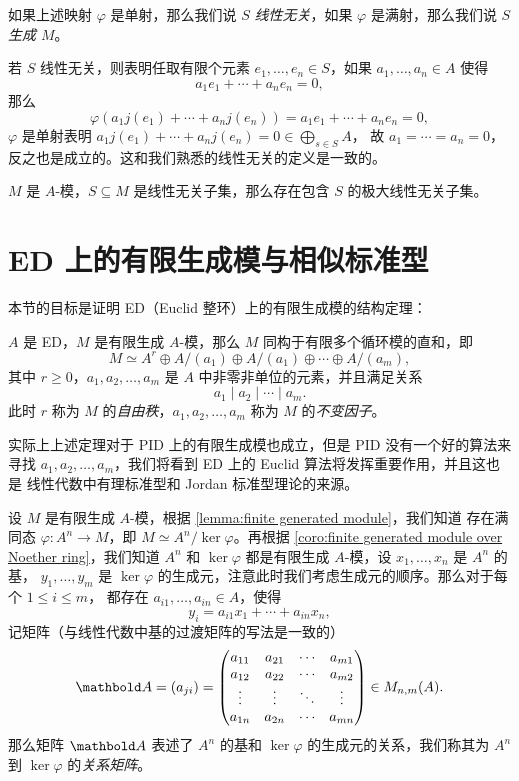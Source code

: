 \begin{definition}
  如果上述映射 $\varphi$ 是单射，那么我们说 $S$ \emph{线性无关}，如果
  $\varphi$ 是满射，那么我们说 $S$ \emph{生成 $M$}。  
\end{definition}

若 $S$ 线性无关，则表明任取有限个元素 $e_1,\dots,e_n\in S$，如果 $a_1,\dots,a_n\in A$
使得
\[
  a_1e_1+\cdots+a_ne_n=0,  
\]
那么
\[
  \varphi(a_1j(e_1)+\cdots+a_nj(e_n))
  =a_1e_1+\cdots+a_ne_n=0,
\]
$\varphi$ 是单射表明 $a_1j(e_1)+\cdots+a_nj(e_n)=0\in \bigoplus_{s\in S}A$，
故 $a_1=\cdots=a_n=0$，反之也是成立的。这和我们熟悉的线性无关的定义是一致的。

\begin{lemma}
  $M$ 是 $A$-模，$S\subseteq M$ 是线性无关子集，那么存在包含 $S$ 的极大线性无关子集。
\end{lemma}


\section{ED 上的有限生成模与相似标准型}

本节的目标是证明 ED（Euclid 整环）上的有限生成模的结构定理：

\begin{theorem}\label{thm:invariant form}
  $A$ 是 ED，$M$ 是有限生成 $A$-模，那么 $M$ 同构于有限多个循环模的直和，即
  \[
    M\simeq A^r\oplus A/(a_1)\oplus A/(a_1)\oplus\cdots  \oplus A/(a_m),
  \]
  其中 $r\geq 0$，$a_1,a_2,\dots,a_m$ 是 $A$ 中非零非单位的元素，并且满足关系
  \[
    a_1\mid a_2\mid\cdots\mid a_m.  
  \]
  此时 $r$ 称为 $M$ 的\emph{自由秩}，$a_1,a_2,\dots,a_m$ 称为 $M$ 的\emph{不变因子}。
\end{theorem}

实际上上述定理对于 PID 上的有限生成模也成立，但是 PID 没有一个好的算法来寻找
$a_1,a_2,\dots,a_m$，我们将看到 ED 上的 Euclid 算法将发挥重要作用，并且这也是
线性代数中有理标准型和 Jordan 标准型理论的来源。

设 $M$ 是有限生成 $A$-模，根据 \autoref{lemma:finite generated module}，我们知道
存在满同态 $\varphi:A^n\to M$，即 $M\simeq A^n/\ker\varphi$。再根据
\autoref{coro:finite generated module over Noether ring}，我们知道 $A^n$
和 $\ker\varphi$ 都是有限生成 $A$-模，设 $x_1,\dots,x_n$ 是 $A^n$ 的基，
$y_1,\dots,y_m$ 是 $\ker\varphi$ 的生成元，注意此时我们考虑生成元的顺序。那么对于每个 $1\leq i\leq m$，
都存在 $a_{i1},\dots,a_{in}\in A$，使得
\[
  y_i=a_{i1}x_1+\cdots+a_{in}x_n  ,
\]
记矩阵（与线性代数中基的过渡矩阵的写法是一致的）
\[
  \mat A=(a_{ji})=
  \begin{pmatrix}
    a_{11} & a_{21} & \cdots & a_{m1} \\
    a_{12} & a_{22} & \cdots & a_{m2} \\
    \vdots & \vdots & \ddots & \vdots \\
    a_{1n} & a_{2n} & \cdots & a_{mn}
  \end{pmatrix}  \in M_{n,m}(A).
\]
那么矩阵 $\mat A$ 表述了 $A^n$ 的基和 $\ker\varphi$ 的生成元的关系，我们称其为
$A^n$ 到 $\ker\varphi$ 的\emph{关系矩阵}。

